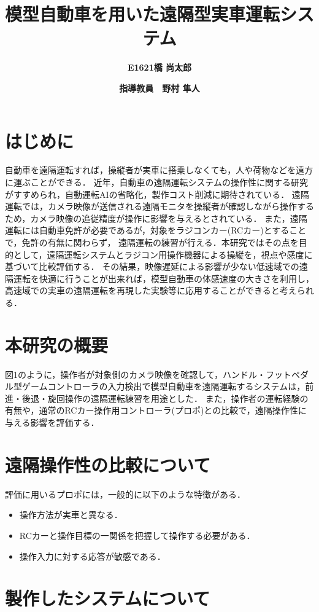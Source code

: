 \documentclass[a4paper,10pt,twocolumn]{jsarticle}
\begin{document}
\title{\Large {\textbf{模型自動車を用いた遠隔型実車運転システム}}}
\author{\textbf{E1621橋 尚太郎}\and \textbf{指導教員　}\textbf{野村 隼人}}
\date{}
\maketitle
\section{はじめに}
自動車を遠隔運転すれば，操縦者が実車に搭乗しなくても，人や荷物などを遠方に運ぶことができる．
近年，自動車の遠隔運転システムの操作性に関する研究がすすめられ，自動運転AIの省略化，製作コスト削減に期待されている．
遠隔運転では，カメラ映像が送信される遠隔モニタを操縦者が確認しながら操作するため，カメラ映像の追従精度が操作に影響を与えるとされている．
また，遠隔運転には自動車免許が必要であるが，対象をラジコンカー(RCカー)とすることで，免許の有無に関わらず，
遠隔運転の練習が行える．本研究ではその点を目的として，遠隔運転システムとラジコン用操作機器による操縦を，視点や感度に基づいて比較評価する．
その結果，映像遅延による影響が少ない低速域での遠隔運転を快適に行うことが出来れば，模型自動車の体感速度の大きさを利用し，高速域での実車の遠隔運転を再現した実験等に応用することができると考えられる．
\section{本研究の概要}
図1のように，操作者が対象側のカメラ映像を確認して，ハンドル・フットペダル型ゲームコントローラの入力検出で模型自動車を遠隔運転するシステムは，前進・後退・旋回操作の遠隔運転練習を用途とした．
また，操作者の運転経験の有無や，通常のRCカー操作用コントローラ(プロポ)との比較で，遠隔操作性に与える影響を評価する．
\section{遠隔操作性の比較について}
評価に用いるプロポには，一般的に以下のような特徴がある．
\begin{itemize}
    \item 操作方法が実車と異なる．
    \item RCカーと操作目標の一関係を把握して操作する必要がある．
    \item 操作入力に対する応答が敏感である．
\end{itemize}
\section{製作したシステムについて}
\end{document}

